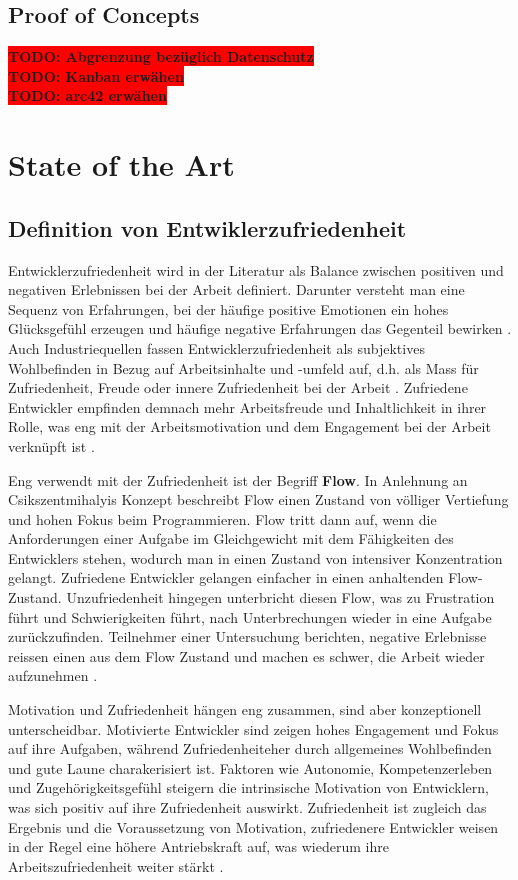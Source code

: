 \documentclass[12pt,a4paper]{report}
\newcommand{\todo}[1]{\colorbox{red}{\textbf{TODO: #1}}\\}
\begin{document}
\section{Proof of Concepts}
\todo{Abgrenzung bezüglich Datenschutz}
\todo{Kanban erwähen}
\todo{arc42 erwähen}

\chapter{State of the Art}
\section{Definition von Entwiklerzufriedenheit}

Entwicklerzufriedenheit wird in der Literatur als Balance zwischen positiven und negativen Erlebnissen bei der
Arbeit definiert. Darunter versteht man eine Sequenz von Erfahrungen, bei der häufige positive Emotionen ein
hohes Glücksgefühl erzeugen und häufige negative Erfahrungen das Gegenteil bewirken \cite{sadowski_happiness_2019}.
Auch Industriequellen fassen Entwicklerzufriedenheit als subjektives Wohlbefinden in Bezug auf Arbeitsinhalte
und -umfeld auf, d.h. als Mass für Zufriedenheit, Freude oder innere Zufriedenheit bei der Arbeit \cite{zenhub_2022_nodate}.
Zufriedene Entwickler empfinden demnach mehr Arbeitsfreude und Inhaltlichkeit in ihrer Rolle, was eng mit
der Arbeitsmotivation und dem Engagement bei der Arbeit verknüpft ist \cite{franca_motivation_2020}.

Eng verwendt mit der Zufriedenheit ist der Begriff \textbf{Flow}. In Anlehnung an Csikszentmihalyis Konzept beschreibt
Flow einen Zustand von völliger Vertiefung und hohen Fokus beim Programmieren. Flow tritt dann auf, wenn die Anforderungen
einer Aufgabe im Gleichgewicht mit dem Fähigkeiten des Entwicklers stehen, wodurch man in einen Zustand von intensiver 
Konzentration gelangt. Zufriedene Entwickler gelangen einfacher in einen anhaltenden Flow-Zustand. Unzufriedenheit
hingegen unterbricht diesen Flow, was zu Frustration führt und Schwierigkeiten führt, nach Unterbrechungen wieder in
eine Aufgabe zurückzufinden. Teilnehmer einer Untersuchung berichten, negative Erlebnisse reissen einen aus dem Flow
Zustand und machen es schwer, die Arbeit wieder aufzunehmen \cite{sadowski_happiness_2019}.

Motivation und Zufriedenheit hängen eng zusammen, sind aber konzeptionell unterscheidbar. Motivierte Entwickler sind
zeigen hohes Engagement und Fokus auf ihre Aufgaben, während Zufriedenheiteher durch allgemeines Wohlbefinden und gute
Laune charakerisiert ist. Faktoren wie Autonomie, Kompetenzerleben und Zugehörigkeitsgefühl steigern die intrinsische 
Motivation von Entwicklern, was sich positiv auf ihre Zufriedenheit auswirkt. Zufriedenheit ist zugleich das Ergebnis und
die Voraussetzung von Motivation, zufriedenere Entwickler weisen in der Regel eine höhere Antriebskraft auf, was wiederum ihre
Arbeitszufriedenheit weiter stärkt \cite{franca_motivation_2020}.
\end{document}
